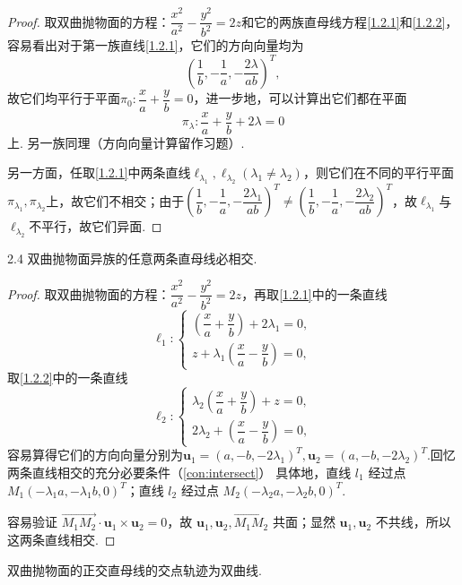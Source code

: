 \documentclass[12pt, a4paper,newtx]{ctexart}
\begin{document}
\begin{proof}
	取双曲抛物面的方程：$\dfrac{x^2}{a^2}-\dfrac{y^2}{b^2}=2z$和它的两族直母线方程\eqref{1.2.1}和\eqref{1.2.2}，容易看出对于第一族直线\eqref{1.2.1}，它们的方向向量均为\[\left(\dfrac1b,-\dfrac1a,-\dfrac{2\lambda}{ab}\right)^T,\]故它们均平行于平面$\pi_0:\dfrac{x}a+\dfrac{y}b=0$，进一步地，可以计算出它们都在平面\[\pi_{\lambda}:\frac{x}{a}+\frac{y}{b}+2\lambda=0\]上. 另一族同理（方向向量计算留作习题）. 
	
	另一方面，任取\eqref{1.2.1}中两条直线$\ell_{\lambda_1},\ell_{\lambda_2}(\lambda_1\ne\lambda_2)$，则它们在不同的平行平面$\pi_{\lambda_1},\pi_{\lambda_2}$上，故它们不相交；由于$\left(\dfrac1b,-\dfrac1a,-\dfrac{2\lambda_1}{ab}\right)^T\ne\left(\dfrac1b,-\dfrac1a,-\dfrac{2\lambda_2}{ab}\right)^T$，故$\ell_{\lambda_1}$与$\ell_{\lambda_2}$不平行，故它们异面. 
\end{proof}
\begin{property}{}{2.4}
	双曲抛物面异族的任意两条直母线必相交. 
\end{property}
\begin{proof}
	取双曲抛物面的方程：$\dfrac{x^2}{a^2}-\dfrac{y^2}{b^2}=2z$，再取\eqref{1.2.1}中的一条直线\[\ell_1:\begin{cases}
	\left(\dfrac{x}a+\dfrac{y}{b}\right)+2\lambda_1=0,\\
	z+\lambda_1\left(\dfrac{x}a-\dfrac{y}{b}\right)=0,
	\end{cases}\]取\eqref{1.2.2}中的一条直线\[\ell_2:\begin{cases}
	\lambda_2\left(\dfrac{x}a+\dfrac{y}{b}\right)+z=0,\\
	2\lambda_2+\left(\dfrac{x}a-\dfrac{y}{b}\right)=0,
	\end{cases}\]
	容易算得它们的方向向量分别为$\bm u_1=\left(a,-b,-2\lambda_1\right)^T,\bm u_2=\left(a,-b,-2\lambda_2\right)^T.$回忆两条直线相交的充分必要条件（\ref{con:intersect}）
	具体地，直线 $l_1$ 经过点 $M_1 \left( -\lambda_1 a, -\lambda_1 b, 0 \right)^T$；直线 $l_2$ 经过点 $M_2 \left( -\lambda_2 a, -\lambda_2 b, 0 \right)^T$.
	
	容易验证 $\overrightarrow{M_1M_2} \cdot \bm{u}_1 \times \bm{u}_2 = 0$，故 $\bm{u}_1, \bm{u}_2, \overrightarrow{M_1M_2}$ 共面；显然 $\bm{u}_1, \bm{u}_2$ 不共线，所以这两条直线相交. 
\end{proof}
\begin{property}{}{}
	双曲抛物面的正交直母线的交点轨迹为双曲线. 
\end{property}
\end{document}
